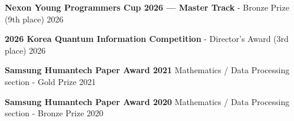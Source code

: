 \par
{}
\par
\begin{cvhonors}
\cvhonor
    {\textbf{Nexon Young Programmers Cup 2026 --- Master Track} - Bronze Prize (9th place)}
    {2026}

\cvhonor
    {\textbf{2026 Korea Quantum Information Competition} - Director's Award (3rd place)}
    {2026}

\cvhonor
    {\textbf{Samsung Humantech Paper Award 2021} Mathematics / Data Processing section - Gold Prize}
    {2021}

\cvhonor
    {\textbf{Samsung Humantech Paper Award 2020} Mathematics / Data Processing section - Bronze Prize}
    {2020}
\end{cvhonors}

